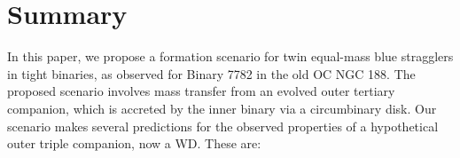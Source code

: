\documentclass{aastex62}
\begin{document}

\section{Summary} \label{sect:conclusions}

In this paper, we propose a formation scenario for twin equal-mass blue stragglers 
in tight binaries, as observed for Binary 7782 in the old OC
NGC 188.  The proposed scenario involves mass transfer from an evolved
outer tertiary companion, which is accreted by the inner binary via a
circumbinary disk.  Our scenario makes several predictions for the
observed properties of a hypothetical outer triple companion, now a
WD.  These are:
\end{document}
